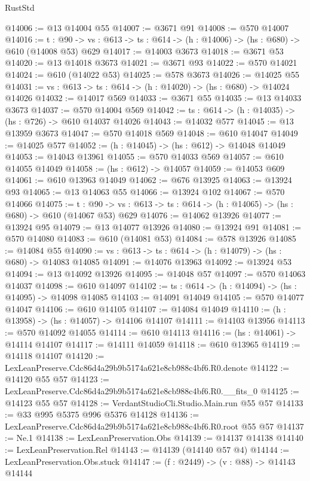 \begin{lexlean}{RustStd}
\begin{coremodule}
@14006 := @13 @14004 @55
@14007 := @3671 @91
@14008 := @570 @14007
@14016 := {t : @90} ->
  {vs : @613} -> {ts : @614} -> (h : @14006) -> (hs : @680) -> @610 (@14008 @53) @629
@14017 := @14003 @3673
@14018 := @3671 @53
@14020 := @13 @14018 @3673
@14021 := @3671 @93
@14022 := @570 @14021
@14024 := @610 (@14022 @53)
@14025 := @578 @3673
@14026 := @14025 @55
@14031 := {vs : @613} -> {ts : @614} -> (h : @14020) -> (hs : @680) -> @14024 @14026
@14032 := @14017 @569
@14033 := @3671 @55
@14035 := @13 @14033 @3673
@14037 := @570 @14004 @569
@14042 := {ts : @614} -> (h : @14035) -> (hs : @726) -> @610 @14037 @14026
@14043 := @14032 @577
@14045 := @13 @13959 @3673
@14047 := @570 @14018 @569
@14048 := @610 @14047
@14049 := @14025 @577
@14052 := (h : @14045) -> (hs : @612) -> @14048 @14049
@14053 := @14043 @13961
@14055 := @570 @14033 @569
@14057 := @610 @14055 @14049
@14058 := (hs : @612) -> @14057
@14059 := @14053 @609
@14061 := @610 @13963 @14049
@14062 := @676 @13925
@14063 := @13924 @93
@14065 := @13 @14063 @55
@14066 := @13924 @102
@14067 := @570 @14066
@14075 := {t : @90} ->
  {vs : @613} -> {ts : @614} -> (h : @14065) -> (hs : @680) -> @610 (@14067 @53) @629
@14076 := @14062 @13926
@14077 := @13924 @95
@14079 := @13 @14077 @13926
@14080 := @13924 @91
@14081 := @570 @14080
@14083 := @610 (@14081 @53)
@14084 := @578 @13926
@14085 := @14084 @55
@14090 := {vs : @613} -> {ts : @614} -> (h : @14079) -> (hs : @680) -> @14083 @14085
@14091 := @14076 @13963
@14092 := @13924 @53
@14094 := @13 @14092 @13926
@14095 := @14048 @57
@14097 := @570 @14063 @14037
@14098 := @610 @14097
@14102 := {ts : @614} -> (h : @14094) -> (hs : @14095) -> @14098 @14085
@14103 := @14091 @14049
@14105 := @570 @14077 @14047
@14106 := @610 @14105
@14107 := @14084 @14049
@14110 := (h : @13958) -> (hs : @14057) -> @14106 @14107
@14111 := @14103 @13956
@14113 := @570 @14092 @14055
@14114 := @610 @14113
@14116 := (hs : @14061) -> @14114 @14107
@14117 := @14111 @14059
@14118 := @610 @13965
@14119 := @14118 @14107
@14120 := LexLeanPreserve.Cdc86d4a29b9b5174a621e8cb988c4bf6.R0.denote
@14122 := @14120 @55 @57
@14123 := LexLeanPreserve.Cdc86d4a29b9b5174a621e8cb988c4bf6.R0.__fits_0
@14125 := @14123 @55 @57
@14128 := VerdantStudioCli.Studio.Main.run @55 @57
@14133 := @33 @995 @5375 @996 @5376 @14128
@14136 := LexLeanPreserve.Cdc86d4a29b9b5174a621e8cb988c4bf6.R0.root @55 @57
@14137 := Ne.{1}
@14138 := LexLeanPreservation.Obs
@14139 := @14137 @14138
@14140 := LexLeanPreservation.Rel
@14143 := @14139 (@14140 @57 @4)
@14144 := LexLeanPreservation.Obs.stuck
@14147 := (f : @2449) -> (v : @88) -> @14143 @14144

\end{coremodule}
\end{lexlean}
